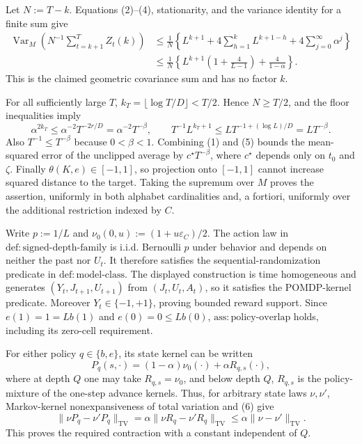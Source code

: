 Let \(N:=T-k\).  Equations (2)--(4), stationarity, and the variance identity for a finite sum give
\[
 \begin{split}
 \operatorname{Var}_M\!\left(N^{-1}\sum_{t=k+1}^TZ_t(k)\right)
 &\le \frac1N\left\{L^{k+1}
       +4\sum_{h=1}^kL^{k+1-h}
       +4\sum_{j=0}^{\infty}\alpha^j\right\}\\
 &\le \frac1N\left\{L^{k+1}\left(1+\frac4{L-1}\right)
       +\frac4{1-\alpha}\right\}.
 \end{split}\tag{5}
\]
This is the claimed geometric covariance sum and has no factor \(k\).

For all sufficiently large \(T\), \(k_T=\lfloor\log T/D\rfloor<T/2\).  Hence \(N\ge T/2\), and the floor inequalities imply
\[
 \alpha^{2k_T}\le \alpha^{-2}T^{-2r/D}=\alpha^{-2}T^{-\beta},
 \qquad
 T^{-1}L^{k_T+1}\le L T^{-1+(\log L)/D}=LT^{-\beta}.
\]
Also \(T^{-1}\le T^{-\beta}\) because \(0<\beta<1\).  Combining (1) and (5) bounds the mean-squared error of the unclipped average by \(c^\star T^{-\beta}\), where \(c^\star\) depends only on \(t_0\) and \(\zeta\).  Finally \(\theta(K,e)\in[-1,1]\), so projection onto \([-1,1]\) cannot increase squared distance to the target.  Taking the supremum over \(M\) proves the assertion, uniformly in both alphabet cardinalities and, a fortiori, uniformly over the additional restriction indexed by \(C\).

Write \(p:=1/L\) and \(\nu_0(0,u):=(1+u\varepsilon_C)/2\).  The action law in \(\mathrm{def{:}signed\text{-}depth\text{-}family}\) is i.i.d. Bernoulli \(p\) under behavior and depends on neither the past nor \(U_t\).  It therefore satisfies the sequential-randomization predicate in \(\mathrm{def{:}model\text{-}class}\).  The displayed construction is time homogeneous and generates \((Y_t,J_{t+1},U_{t+1})\) from \((J_t,U_t,A_t)\), so it satisfies the POMDP-kernel predicate.  Moreover \(Y_t\in\{-1,+1\}\), proving bounded reward support.  Since \(e(1)=1=Lb(1)\) and \(e(0)=0\le Lb(0)\), \(\mathrm{ass{:}policy\text{-}overlap}\) holds, including its zero-cell requirement.

For either policy \(q\in\{b,e\}\), its state kernel can be written
\[
 P_q(s,\cdot)=(1-\alpha)\nu_0(\cdot)+\alpha R_{q,s}(\cdot), \tag{6}
\]
where at depth \(Q\) one may take \(R_{q,s}=\nu_0\), and below depth \(Q\), \(R_{q,s}\) is the policy-mixture of the one-step advance kernels.  Thus, for arbitrary state laws \(\nu,\nu'\), Markov-kernel nonexpansiveness of total variation and (6) give
\[
 \|\nu P_q-\nu'P_q\|_{\mathrm{TV}}
 =\alpha\|\nu R_q-\nu'R_q\|_{\mathrm{TV}}
 \le\alpha\|\nu-\nu'\|_{\mathrm{TV}}. \tag{7}
\]
This proves the required contraction with a constant independent of \(Q\).

